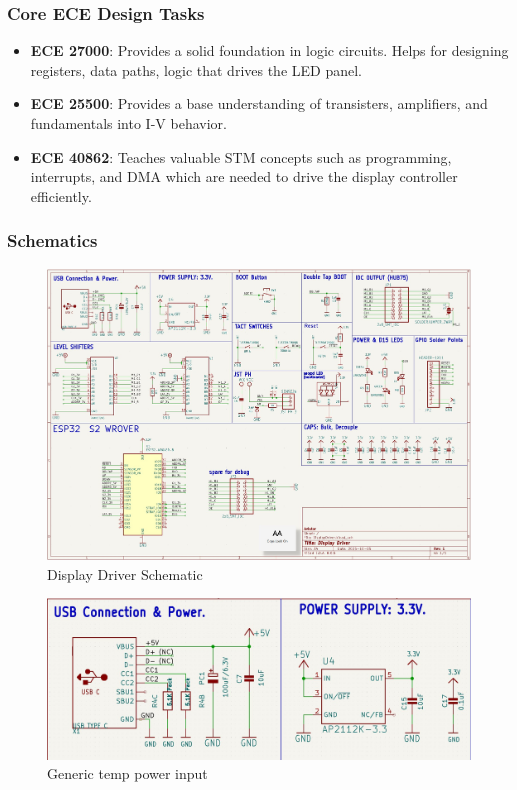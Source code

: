 \subsubsection{Core ECE Design Tasks}
\begin{itemize}
    \item \textbf{ECE 27000}: Provides a solid foundation in logic circuits. Helps for designing registers, data paths, logic that drives the LED panel.
    \item \textbf{ECE 25500}: Provides a base understanding of transisters, amplifiers, and fundamentals into I-V behavior.
    \item \textbf{ECE 40862}: Teaches valuable STM concepts such as programming, interrupts, and DMA which are needed to drive the display controller efficiently.
\end{itemize}

\subsubsection{Schematics}

\begin{figure}[H]
    \centering
    \includegraphics[width=12cm]{images/DisplayDriver/DisplayDriver Schematic.jpg}
    \caption{Display Driver Schematic}
\end{figure}

\begin{figure}[H]
    \centering
    \includegraphics[width=12cm]{images/DisplayDriver/USBPwrGeneric.jpg}
    \caption{Generic temp power input}
\end{figure}


